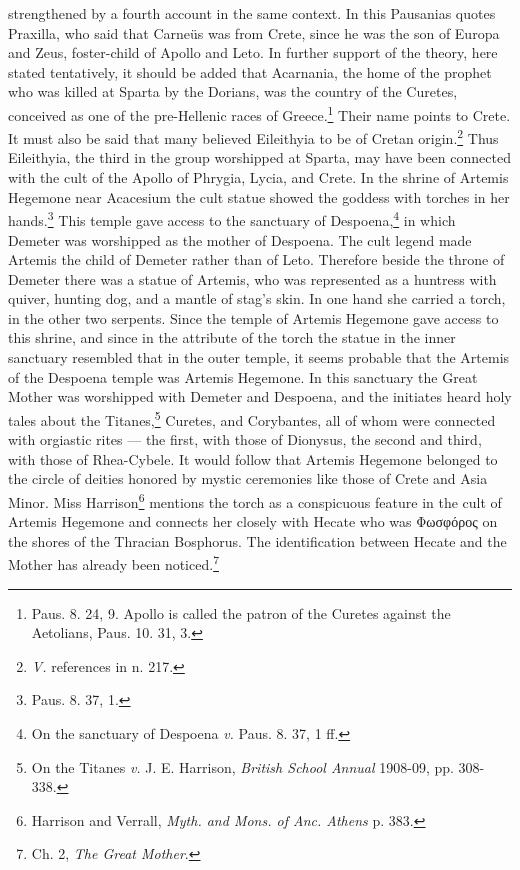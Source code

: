 \documentclass[a4paper, 12pt, oneside]{article}
\begin{document}
strengthened by a fourth account in the same context. In this Pausanias quotes Praxilla, who said that Carneüs was from Crete, since he was the son of Europa and Zeus, foster-child of Apollo and Leto. In further support of the theory, here stated tentatively, it should be added that Acarnania, the home of the prophet who was killed at Sparta by the Dorians, was the country of the Curetes, conceived as one of the pre-Hellenic races of Greece.\footnote{Paus. 8. 24, 9. Apollo is called the patron of the Curetes against the Aetolians, Paus. 10. 31, 3.} Their name points to Crete. It must also be said that many believed Eileithyia to be of Cretan origin.\footnote{\emph{V.} references in n. 217.} Thus Eileithyia, the third in the group worshipped at Sparta, may have been connected with the cult of the Apollo of Phrygia, Lycia, and Crete. In the shrine of Artemis Hegemone near Acacesium the cult statue showed the goddess with torches in her hands.\footnote{Paus. 8. 37, 1.} This temple gave access to the sanctuary of Despoena,\footnote{On the sanctuary of Despoena \emph{v.} Paus. 8. 37, 1 ff.} in which Demeter was worshipped as the mother of Despoena. The cult legend made Artemis the child of Demeter rather than of Leto. Therefore beside the throne of Demeter there was a statue of Artemis, who was represented as a huntress with quiver, hunting dog, and a mantle of stag's skin. In one hand she carried a torch, in the other two serpents. Since the temple of Artemis Hegemone gave access to this shrine, and since in the attribute of the torch the statue in the inner sanctuary resembled that in the outer temple, it seems probable that the Artemis of the Despoena temple was Artemis Hegemone. In this sanctuary the Great Mother was worshipped with Demeter and Despoena, and the initiates heard holy tales about the Titanes,\footnote{On the Titanes \emph{v.} J. E. Harrison, \emph{British School Annual} 1908-09, pp. 308-338.} Curetes, and Corybantes, all of whom were connected with orgiastic rites --- the first, with those of Dionysus, the second and third, with those of Rhea-Cybele. It would follow that Artemis Hegemone belonged to the circle of deities honored by mystic ceremonies like those of Crete and Asia Minor. Miss Harrison\footnote{Harrison and Verrall, \emph{Myth. and Mons. of Anc. Athens} p. 383.} mentions the torch as a conspicuous feature in the cult of Artemis Hegemone and connects her closely with Hecate who was Φωσφόρος on the shores of the Thracian Bosphorus. The identification between Hecate and the Mother has already been noticed.\footnote{Ch. 2, \emph{The Great Mother}.}
\end{document}
